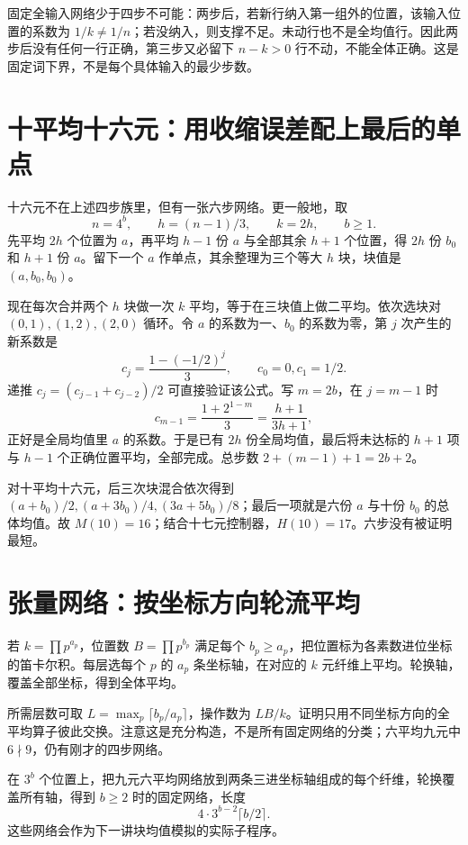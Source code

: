 固定全输入网络少于四步不可能：两步后，若新行纳入第一组外的位置，该输入位置的系数为 $1/k\ne1/n$；若没纳入，则支撑不足。未动行也不是全均值行。因此两步后没有任何一行正确，第三步又必留下 $n-k>0$ 行不动，不能全体正确。这是固定词下界，不是每个具体输入的最少步数。

\section{十平均十六元：用收缩误差配上最后的单点}
十六元不在上述四步族里，但有一张六步网络。更一般地，取
\[n=4^b,\qquad h=(n-1)/3,\qquad k=2h,\qquad b\ge1.
\]
先平均 $2h$ 个位置为 $a$，再平均 $h-1$ 份 $a$ 与全部其余 $h+1$ 个位置，得 $2h$ 份 $b_0$ 和 $h+1$ 份 $a$。留下一个 $a$ 作单点，其余整理为三个等大 $h$ 块，块值是 $(a,b_0,b_0)$。

现在每次合并两个 $h$ 块做一次 $k$ 平均，等于在三块值上做二平均。依次选块对 $(0,1),(1,2),(2,0)$ 循环。令 $a$ 的系数为一、$b_0$ 的系数为零，第 $j$ 次产生的新系数是
\[c_j=\frac{1-(-1/2)^j}{3},\qquad c_0=0,c_1=1/2.
\]
递推 $c_j=(c_{j-1}+c_{j-2})/2$ 可直接验证该公式。写 $m=2b$，在 $j=m-1$ 时
\[c_{m-1}=\frac{1+2^{1-m}}3=\frac{h+1}{3h+1},
\]
正好是全局均值里 $a$ 的系数。于是已有 $2h$ 份全局均值，最后将未达标的 $h+1$ 项与 $h-1$ 个正确位置平均，全部完成。总步数 $2+(m-1)+1=2b+2$。

对十平均十六元，后三次块混合依次得到 $(a+b_0)/2,(a+3b_0)/4,(3a+5b_0)/8$；最后一项就是六份 $a$ 与十份 $b_0$ 的总体均值。故 $M(10)=16$；结合十七元控制器，$H(10)=17$。六步没有被证明最短。

\section{张量网络：按坐标方向轮流平均}
若 $k=\prod p^{a_p}$，位置数 $B=\prod p^{b_p}$ 满足每个 $b_p\ge a_p$，把位置标为各素数进位坐标的笛卡尔积。每层选每个 $p$ 的 $a_p$ 条坐标轴，在对应的 $k$ 元纤维上平均。轮换轴，覆盖全部坐标，得到全体平均。

所需层数可取 $L=\max_p\lceil b_p/a_p\rceil$，操作数为 $LB/k$。证明只用不同坐标方向的全平均算子彼此交换。注意这是充分构造，不是所有固定网络的分类；六平均九元中 $6\nmid9$，仍有刚才的四步网络。

在 $3^b$ 个位置上，把九元六平均网络放到两条三进坐标轴组成的每个纤维，轮换覆盖所有轴，得到 $b\ge2$ 时的固定网络，长度
\[4\cdot3^{b-2}\lceil b/2\rceil.
\]
这些网络会作为下一讲块均值模拟的实际子程序。
